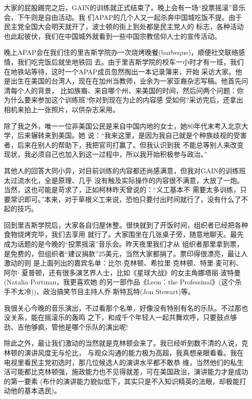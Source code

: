 ﻿\documentclass[11pt]{article}
\begin{document}
大家的屁股踢完之后，GAIN的训练就正式结束了。晚上会有一场``投票摇滚''音乐会，下午则是自由活动。我
们APAP的几个人又一起杀奔中国城吃饭不提。由于民主党全国大会明天就开了，波士顿的街上到处都是民主党人的
标志，各种活动也此起彼伏，我们在中国城外就看到一些中国宗教信仰人士的宣传活动。

晚上APAP会在我们住的里吉斯学院办一次烧烤晚餐(barbeque)，顺便社交联络感情，我们吃完饭后就坐地铁回
去。由于里吉斯学院的校车一小时才有一班，我们在地铁站等待，这时一个APAP成员忽然掏出一本记录簿来，开始
采访大家。他是出生在美国的台湾人，现在在加州当教师，业余为一家亚裔杂志写稿。他首先问清每个人的背景，
比如族裔、来自哪个州、来美国的时间，然后问两个问题：你为什么要来参加这个训练班?你对到现在为止的内容感
受如何?采访完后，还拿出相机来拍上一张照片，以供杂志采用。

除了我之外，唯一一位非美国公民是来自中国内地的女士，她80年代末考入北京大学，后来辗转来到美国。她
说：``我来这里，是因为我自己就是个种族歧视的受害者，后来在别人的帮助下，我把官司打赢了。但我认识到我
不能总等别人来改变现状，我必须自己也加入到这一过程中，所以我开始积极参与政治。''

其他人的回答大同小异，对目前训练的内容都还尚感满意，但我对GAIN的训练班太过流水化，全是原理、几乎
没有触及实际操作的内容很不满意，大放了一炮。当然，这也可能是苛求了，正如柯林昨天曾说的：``义工基本不
需要太多训练，只要常识即可。''本来，对于草根义工来说，恐怕只要付出时间就行了，没有什么了不起的技巧。

回到里吉斯学院后，大家各自归屋休整。很快就到了开饭时间，组织者已经把各种食物烧烤完毕，我们去享用
就行了。大家围坐在几张桌子旁，随意地聊天。最先成为话题的是今晚的``投票摇滚''音乐会。昨天夜里我们才从
组织者那里拿到票，是免费的，但组织者``建议捐款''25美元，当然大家都捐了。票印得很漂亮，最让人激动的则
是上面列出的嘉宾名单：比尔$\cdot$克林顿、希拉里$\cdot$克林顿、特里$\cdot$麦可利、阿尔$\cdot$
夏普顿，还有很多演艺界人士，比如《星球大战》的女主角娜塔丽$\cdot$波特曼(Natalia Portman，我更喜欢她
的另一部作品《Leon：the Professinal》(这个杀手不太冷))、政治搞笑节目主持人乔$\cdot$斯特瓦特(Jon
Stewart)等。

我很关心今晚的音乐演出，不过看那个名单，好像没有特别有名的乐队。不过那也没关系，能在摇滚乐的轰鸣
之下，和成千个年轻人一起共舞欢呼，只要鼓点够劲、吉他够疯，管他是哪个乐队的演出呢!

除此之外，最让我们激动的当然就是克林顿会来了。我已经听到数不清的人说，克林顿的演讲风度无与伦比，
与观众沟通的能力极为高超，我真想亲眼看看。我在电视里看民主党初选时，那几位候选人的演讲水平都不敢恭
维，当然他们的私生活可能都比克林顿强，施政能力也不见得就差，可在美国政治，演讲能力才是成功的第一要素
(布什的演讲能力貌似低下，其实只是不入知识精英的法眼，却极能打动他的基本选民)。
\end{document}

